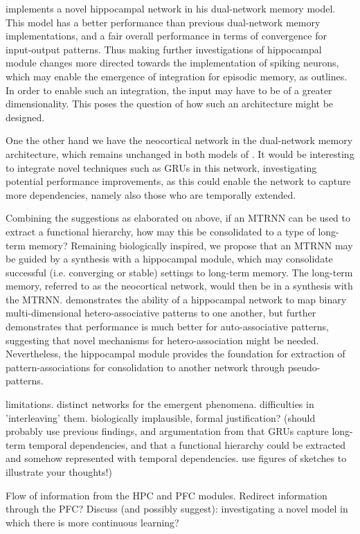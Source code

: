 \cite{Hattori2014} implements a novel hippocampal network in his dual-network memory model. This model has a better performance than previous dual-network memory implementations, and a fair overall performance in terms of convergence for input-output patterns. Thus making further investigations of hippocampal module changes more directed towards the implementation of spiking neurons, which may enable the emergence of integration for episodic memory, as \cite{Hattori2014} outlines. In order to enable such an integration, the input may have to be of a greater dimensionality. This poses the question of how such an architecture might be designed.

One the other hand we have the neocortical network in the dual-network memory architecture, which remains unchanged in both models of \cite{Hattori2010, Hattori2014}. It would be interesting to integrate novel techniques such as GRUs in this network, investigating potential performance improvements, as this could enable the network to capture more dependencies, namely also those who are temporally extended.

Combining the suggestions as elaborated on above, if an MTRNN can be used to extract a functional hierarchy, how may this be consolidated to a type of long-term memory? Remaining biologically inspired, we propose that an MTRNN may be guided by a synthesis with a hippocampal module, which may consolidate successful (i.e. converging or stable) settings to long-term memory. The long-term memory, referred to as the neocortical network, would then be in a synthesis with the MTRNN.
\cite{Hattori2014} demonstrates the ability of a hippocampal network to map binary multi-dimensional hetero-associative patterns to one another, but further demonstrates that performance is much better for auto-associative patterns, suggesting that novel mechanisms for hetero-association might be needed. Nevertheless, the hippocampal module provides the foundation for extraction of pattern-associations for consolidation to another network through pseudo-patterns.

limitations. distinct networks for the emergent phenomena. difficulties in 'interleaving' them. biologically implausible, formal justification? (should probably use previous findings, and argumentation from that GRUs capture long-term temporal dependencies, and that a functional hierarchy could be extracted and somehow represented with temporal dependencies. use figures of sketches to illustrate your thoughts!)

Flow of information from the HPC and PFC modules. Redirect information through the PFC? Discuss (and possibly suggest): investigating a novel model in which there is more continuous learning?

